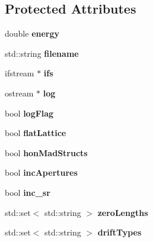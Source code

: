 \subsection*{Protected Attributes}
\begin{DoxyCompactItemize}
\item 
\mbox{\label{classMADInterface_a2ab42ab2c9a23b816c44a7b99218e885}} 
double {\bfseries energy}
\item 
\mbox{\label{classMADInterface_a34c551eac2474df1d886f9bed292bcc0}} 
std\+::string {\bfseries filename}
\item 
\mbox{\label{classMADInterface_a7ca8265e03528e52c4cc6fe5d3fc925b}} 
ifstream $\ast$ {\bfseries ifs}
\item 
\mbox{\label{classMADInterface_a10cee32b471875f95f63773b273ccce6}} 
ostream $\ast$ {\bfseries log}
\item 
\mbox{\label{classMADInterface_a22ca3d722e39990917a4360913610f44}} 
bool {\bfseries log\+Flag}
\item 
\mbox{\label{classMADInterface_a45f77a21bd68d0a06669740c5ea664e8}} 
bool {\bfseries flat\+Lattice}
\item 
\mbox{\label{classMADInterface_a037a808f7945080bc8007e4d5102c21e}} 
bool {\bfseries hon\+Mad\+Structs}
\item 
\mbox{\label{classMADInterface_a339e67bace2fe6783e7232d460043c75}} 
bool {\bfseries inc\+Apertures}
\item 
\mbox{\label{classMADInterface_aa7bd7401dc9642e3549d136d9595e3c7}} 
bool {\bfseries inc\+\_\+sr}
\item 
\mbox{\label{classMADInterface_a24e7babcea40fa122c8386f3f46e0748}} 
std\+::set$<$ std\+::string $>$ {\bfseries zero\+Lengths}
\item 
\mbox{\label{classMADInterface_a470da79cc20dfe838f3704f5edf51b4f}} 
std\+::set$<$ std\+::string $>$ {\bfseries drift\+Types}

\end{DoxyCompactItemize}
